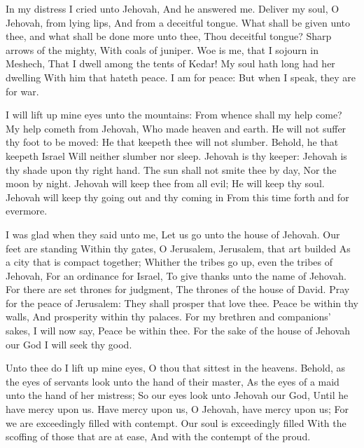 In my distress I cried unto Jehovah, And he answered me.  Deliver my soul, O Jehovah, from lying lips, And from a deceitful tongue.  What shall be given unto thee, and what shall be done more unto thee, Thou deceitful tongue?  Sharp arrows of the mighty, With coals of juniper.  Woe is me, that I sojourn in Meshech, That I dwell among the tents of Kedar!  My soul hath long had her dwelling With him that hateth peace.  I am for peace: But when I speak, they are for war. 

I will lift up mine eyes unto the mountains: From whence shall my help come?  My help cometh from Jehovah, Who made heaven and earth.  He will not suffer thy foot to be moved: He that keepeth thee will not slumber.  Behold, he that keepeth Israel Will neither slumber nor sleep.  Jehovah is thy keeper: Jehovah is thy shade upon thy right hand.  The sun shall not smite thee by day, Nor the moon by night.  Jehovah will keep thee from all evil; He will keep thy soul.  Jehovah will keep thy going out and thy coming in From this time forth and for evermore. 

I was glad when they said unto me, Let us go unto the house of Jehovah.  Our feet are standing Within thy gates, O Jerusalem,  Jerusalem, that art builded As a city that is compact together;  Whither the tribes go up, even the tribes of Jehovah, For an ordinance for Israel, To give thanks unto the name of Jehovah.  For there are set thrones for judgment, The thrones of the house of David.  Pray for the peace of Jerusalem: They shall prosper that love thee.  Peace be within thy walls, And prosperity within thy palaces.  For my brethren and companions’ sakes, I will now say, Peace be within thee.  For the sake of the house of Jehovah our God I will seek thy good. 

Unto thee do I lift up mine eyes, O thou that sittest in the heavens.  Behold, as the eyes of servants look unto the hand of their master, As the eyes of a maid unto the hand of her mistress; So our eyes look unto Jehovah our God, Until he have mercy upon us.  Have mercy upon us, O Jehovah, have mercy upon us; For we are exceedingly filled with contempt.  Our soul is exceedingly filled With the scoffing of those that are at ease, And with the contempt of the proud. 

